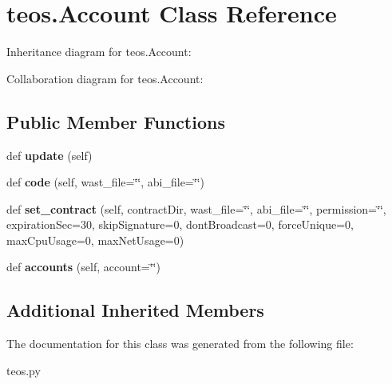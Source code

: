 \hypertarget{classteos_1_1Account}{}\section{teos.\+Account Class Reference}
\label{classteos_1_1Account}


Inheritance diagram for teos.\+Account\+:


Collaboration diagram for teos.\+Account\+:
\subsection*{Public Member Functions}
\begin{DoxyCompactItemize}
\item 
\mbox{\label{classteos_1_1Account_a3613b3225fcb00bc3863ebb1ecfd8ba9}} 
def {\bfseries update} (self)
\item 
\mbox{\label{classteos_1_1Account_a57c26f8b550c8ec2f52b4a5eaa37b984}} 
def {\bfseries code} (self, wast\+\_\+file=\char`\"{}\char`\"{}, abi\+\_\+file=\char`\"{}\char`\"{})
\item 
\mbox{\label{classteos_1_1Account_aa04cdd4d20ea3a8323c58c3c58416ab7}} 
def {\bfseries set\+\_\+contract} (self, contract\+Dir, wast\+\_\+file=\char`\"{}\char`\"{}, abi\+\_\+file=\char`\"{}\char`\"{}, permission=\char`\"{}\char`\"{}, expiration\+Sec=30, skip\+Signature=0, dont\+Broadcast=0, force\+Unique=0, max\+Cpu\+Usage=0, max\+Net\+Usage=0)
\item 
\mbox{\label{classteos_1_1Account_a0d8187ffec04e8fc347668b9c52b9e48}} 
def {\bfseries accounts} (self, account=\char`\"{}\char`\"{})
\end{DoxyCompactItemize}
\subsection*{Additional Inherited Members}


The documentation for this class was generated from the following file\+:\begin{DoxyCompactItemize}
\item 
teos.\+py\end{DoxyCompactItemize}

